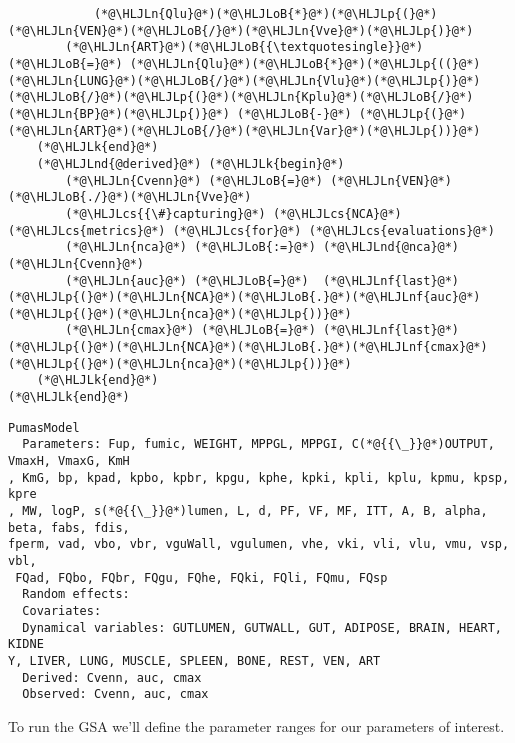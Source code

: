 \documentclass[12pt,a4paper]{article}
\newcommand{\HLJLk}[1]{\textcolor[RGB]{148,91,176}{\textbf{#1}}}
\newcommand{\HLJLn}[1]{#1}
\newcommand{\HLJLnd}[1]{\textcolor[RGB]{214,102,97}{#1}}
\newcommand{\HLJLnf}[1]{\textcolor[RGB]{66,102,213}{#1}}
\newcommand{\HLJLoB}[1]{\textcolor[RGB]{102,102,102}{\textbf{#1}}}
\newcommand{\HLJLp}[1]{#1}
\newcommand{\HLJLcs}[1]{\textcolor[RGB]{153,153,119}{\textit{#1}}}
\begin{document}
\begin{lstlisting}
            (*@\HLJLn{Qlu}@*)(*@\HLJLoB{*}@*)(*@\HLJLp{(}@*)(*@\HLJLn{VEN}@*)(*@\HLJLoB{/}@*)(*@\HLJLn{Vve}@*)(*@\HLJLp{)}@*)
        (*@\HLJLn{ART}@*)(*@\HLJLoB{{\textquotesingle}}@*) (*@\HLJLoB{=}@*) (*@\HLJLn{Qlu}@*)(*@\HLJLoB{*}@*)(*@\HLJLp{((}@*)(*@\HLJLn{LUNG}@*)(*@\HLJLoB{/}@*)(*@\HLJLn{Vlu}@*)(*@\HLJLp{)}@*)(*@\HLJLoB{/}@*)(*@\HLJLp{(}@*)(*@\HLJLn{Kplu}@*)(*@\HLJLoB{/}@*)(*@\HLJLn{BP}@*)(*@\HLJLp{)}@*) (*@\HLJLoB{-}@*) (*@\HLJLp{(}@*)(*@\HLJLn{ART}@*)(*@\HLJLoB{/}@*)(*@\HLJLn{Var}@*)(*@\HLJLp{))}@*)
    (*@\HLJLk{end}@*)
    (*@\HLJLnd{@derived}@*) (*@\HLJLk{begin}@*)
        (*@\HLJLn{Cvenn}@*) (*@\HLJLoB{=}@*) (*@\HLJLn{VEN}@*)(*@\HLJLoB{./}@*)(*@\HLJLn{Vve}@*)
        (*@\HLJLcs{{\#}capturing}@*) (*@\HLJLcs{NCA}@*) (*@\HLJLcs{metrics}@*) (*@\HLJLcs{for}@*) (*@\HLJLcs{evaluations}@*)
        (*@\HLJLn{nca}@*) (*@\HLJLoB{:=}@*) (*@\HLJLnd{@nca}@*) (*@\HLJLn{Cvenn}@*)
        (*@\HLJLn{auc}@*) (*@\HLJLoB{=}@*)  (*@\HLJLnf{last}@*)(*@\HLJLp{(}@*)(*@\HLJLn{NCA}@*)(*@\HLJLoB{.}@*)(*@\HLJLnf{auc}@*)(*@\HLJLp{(}@*)(*@\HLJLn{nca}@*)(*@\HLJLp{))}@*)
        (*@\HLJLn{cmax}@*) (*@\HLJLoB{=}@*) (*@\HLJLnf{last}@*)(*@\HLJLp{(}@*)(*@\HLJLn{NCA}@*)(*@\HLJLoB{.}@*)(*@\HLJLnf{cmax}@*)(*@\HLJLp{(}@*)(*@\HLJLn{nca}@*)(*@\HLJLp{))}@*)
    (*@\HLJLk{end}@*)
(*@\HLJLk{end}@*)
\end{lstlisting}

\begin{lstlisting}
PumasModel
  Parameters: Fup, fumic, WEIGHT, MPPGL, MPPGI, C(*@{{\_}}@*)OUTPUT, VmaxH, VmaxG, KmH
, KmG, bp, kpad, kpbo, kpbr, kpgu, kphe, kpki, kpli, kplu, kpmu, kpsp, kpre
, MW, logP, s(*@{{\_}}@*)lumen, L, d, PF, VF, MF, ITT, A, B, alpha, beta, fabs, fdis, 
fperm, vad, vbo, vbr, vguWall, vgulumen, vhe, vki, vli, vlu, vmu, vsp, vbl,
 FQad, FQbo, FQbr, FQgu, FQhe, FQki, FQli, FQmu, FQsp
  Random effects: 
  Covariates: 
  Dynamical variables: GUTLUMEN, GUTWALL, GUT, ADIPOSE, BRAIN, HEART, KIDNE
Y, LIVER, LUNG, MUSCLE, SPLEEN, BONE, REST, VEN, ART
  Derived: Cvenn, auc, cmax
  Observed: Cvenn, auc, cmax
\end{lstlisting}


To run the GSA we'll define the parameter ranges for our parameters of interest.
\end{document}
